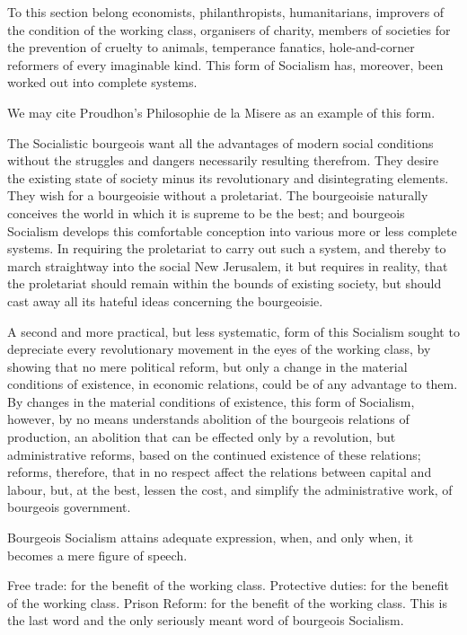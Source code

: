 \documentclass[11pt]{book}
\begin{document}
To this section belong economists, philanthropists,
humanitarians, improvers of the condition of the working class,
organisers of charity, members of societies for the prevention of
cruelty to animals, temperance fanatics, hole-and-corner
reformers of every imaginable kind.  This form of Socialism has,
moreover, been worked out into complete systems.

We may cite Proudhon's Philosophie de la Misere as an example of
this form.

The Socialistic bourgeois want all the advantages of modern
social conditions without the struggles and dangers necessarily
resulting therefrom.  They desire the existing state of society
minus its revolutionary and disintegrating elements.  They wish
for a bourgeoisie without a proletariat.  The bourgeoisie
naturally conceives the world in which it is supreme to be the
best; and bourgeois Socialism develops this comfortable
conception into various more or less complete systems.  In
requiring the proletariat to carry out such a system, and thereby
to march straightway into the social New Jerusalem, it but
requires in reality, that the proletariat should remain within
the bounds of existing society, but should cast away all its
hateful ideas concerning the bourgeoisie.

A second and more practical, but less systematic, form of this
Socialism sought to depreciate every revolutionary movement in
the eyes of the working class, by showing that no mere political
reform, but only a change in the material conditions of
existence, in economic relations, could be of any advantage to
them.  By changes in the material conditions of existence, this
form of Socialism, however, by no means understands abolition of
the bourgeois relations of production, an abolition that can be
effected only by a revolution, but administrative reforms, based
on the continued existence of these relations; reforms,
therefore, that in no respect affect the relations between
capital and labour, but, at the best, lessen the cost, and
simplify the administrative work, of bourgeois government.

Bourgeois Socialism attains adequate expression, when, and only
when, it becomes a mere figure of speech.

Free trade: for the benefit of the working class.  Protective
duties: for the benefit of the working class.  Prison Reform: for
the benefit of the working class.  This is the last word and the
only seriously meant word of bourgeois Socialism.
\end{document}
